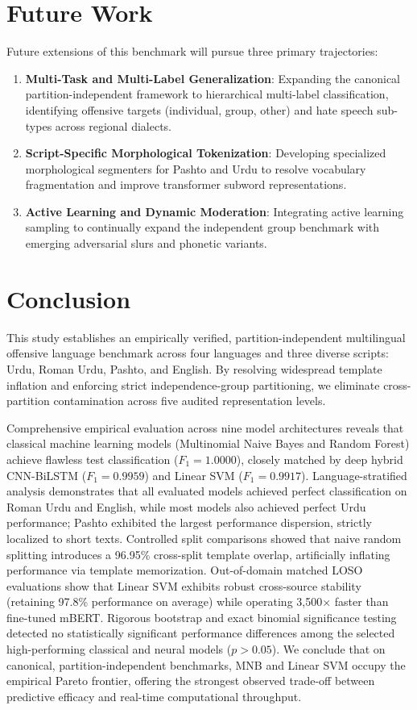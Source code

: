 \documentclass[11pt,a4paper]{article}
\begin{document}
\section{Future Work}\label{sec:future}

Future extensions of this benchmark will pursue three primary trajectories:
\begin{enumerate}
    \item \textbf{Multi-Task and Multi-Label Generalization}: Expanding the canonical partition-independent framework to hierarchical multi-label classification, identifying offensive targets (individual, group, other) and hate speech sub-types across regional dialects.
    \item \textbf{Script-Specific Morphological Tokenization}: Developing specialized morphological segmenters for Pashto and Urdu to resolve vocabulary fragmentation and improve transformer subword representations.
    \item \textbf{Active Learning and Dynamic Moderation}: Integrating active learning sampling to continually expand the independent group benchmark with emerging adversarial slurs and phonetic variants.
\end{enumerate}

\section{Conclusion}\label{sec:conclusion}

This study establishes an empirically verified, partition-independent multilingual offensive language benchmark across four languages and three diverse scripts: Urdu, Roman Urdu, Pashto, and English. By resolving widespread template inflation and enforcing strict independence-group partitioning, we eliminate cross-partition contamination across five audited representation levels. 

Comprehensive empirical evaluation across nine model architectures reveals that classical machine learning models (Multinomial Naive Bayes and Random Forest) achieve flawless test classification ($F_1 = 1.0000$), closely matched by deep hybrid CNN-BiLSTM ($F_1 = 0.9959$) and Linear SVM ($F_1 = 0.9917$). Language-stratified analysis demonstrates that all evaluated models achieved perfect classification on Roman Urdu and English, while most models also achieved perfect Urdu performance; Pashto exhibited the largest performance dispersion, strictly localized to short texts. Controlled split comparisons showed that naive random splitting introduces a 96.95\% cross-split template overlap, artificially inflating performance via template memorization. Out-of-domain matched LOSO evaluations show that Linear SVM exhibits robust cross-source stability (retaining 97.8\% performance on average) while operating 3,500$\times$ faster than fine-tuned mBERT. Rigorous bootstrap and exact binomial significance testing detected no statistically significant performance differences among the selected high-performing classical and neural models ($p > 0.05$). We conclude that on canonical, partition-independent benchmarks, MNB and Linear SVM occupy the empirical Pareto frontier, offering the strongest observed trade-off between predictive efficacy and real-time computational throughput.
\end{document}

